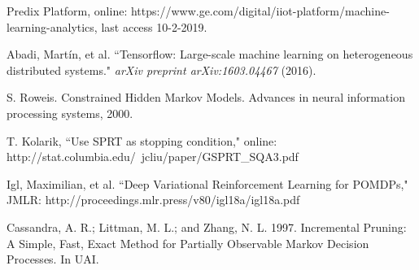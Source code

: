 \documentclass[english]{article}
\numberwithin{equation}{section}
\begin{document}
	
	\begin{thebibliography}{1}
		 Predix Platform, online: https://www.ge.com/digital/iiot-platform/machine-learning-analytics, last access 10-2-2019.		
		
		 Abadi, Martín, et al. ``Tensorflow: Large-scale machine learning on heterogeneous distributed systems." \textit{arXiv preprint arXiv:1603.04467} (2016). 

		S. Roweis. Constrained Hidden Markov Models. Advances in neural information processing systems, 2000.
		
		 T. Kolarik, ``Use SPRT as stopping condition," online: http://stat.columbia.edu/~jcliu/paper/GSPRT\_SQA3.pdf
		
		 Igl, Maximilian, et al. ``Deep Variational Reinforcement Learning for POMDPs," JMLR: http://proceedings.mlr.press/v80/igl18a/igl18a.pdf
		
		 Cassandra, A. R.; Littman, M. L.; and Zhang, N. L.  1997. Incremental Pruning: A Simple, Fast, Exact Method for Partially Observable Markov Decision Processes. In UAI.
	\end{thebibliography}
	
\end{document}
